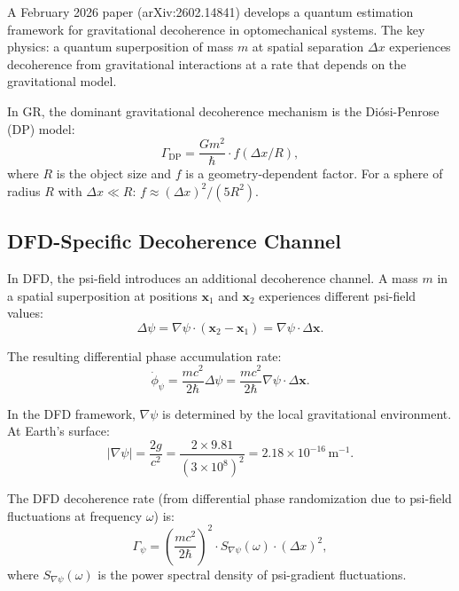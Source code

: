 \documentclass[11pt]{article}
\theoremstyle{definition}
\theoremstyle{remark}
\newcommand{\ee}[1]{\times10^{#1}}
\begin{document}
A February 2026 paper (arXiv:2602.14841) develops a quantum estimation
framework for gravitational decoherence in optomechanical systems.
The key physics: a quantum superposition of mass $m$ at spatial
separation $\Delta x$ experiences decoherence from gravitational
interactions at a rate that depends on the gravitational model.

In GR, the dominant gravitational decoherence mechanism is the
Di\'osi-Penrose (DP) model:
\begin{equation}
\Gamma_{\mathrm{DP}} = \frac{G m^2}{\hbar} \cdot f(\Delta x / R),
\end{equation}
where $R$ is the object size and $f$ is a geometry-dependent factor.
For a sphere of radius $R$ with $\Delta x \ll R$:
$f \approx (\Delta x)^2 / (5 R^2)$.

\subsection{DFD-Specific Decoherence Channel}

In DFD, the psi-field introduces an additional decoherence channel.
A mass $m$ in a spatial superposition at positions $\mathbf{x}_1$ and
$\mathbf{x}_2$ experiences different psi-field values:
\begin{equation}
\Delta\psi = \nabla\psi \cdot (\mathbf{x}_2 - \mathbf{x}_1)
= \nabla\psi \cdot \Delta\mathbf{x}.
\end{equation}

The resulting differential phase accumulation rate:
\begin{equation}
\dot{\phi}_\psi = \frac{m c^2}{2\hbar} \Delta\psi
= \frac{m c^2}{2\hbar} \nabla\psi \cdot \Delta\mathbf{x}.
\end{equation}

In the DFD framework, $\nabla\psi$ is determined by the local
gravitational environment. At Earth's surface:
\begin{equation}
|\nabla\psi| = \frac{2g}{c^2} = \frac{2 \times 9.81}{(3\ee{8})^2}
= 2.18\ee{-16}\,\mathrm{m}^{-1}.
\end{equation}

The DFD decoherence rate (from differential phase randomization
due to psi-field fluctuations at frequency $\omega$) is:
\begin{equation}
\Gamma_\psi = \left(\frac{m c^2}{2\hbar}\right)^2
\cdot S_{\nabla\psi}(\omega) \cdot (\Delta x)^2,
\end{equation}
where $S_{\nabla\psi}(\omega)$ is the power spectral density of
psi-gradient fluctuations.
\end{document}
